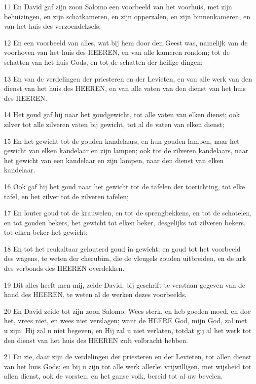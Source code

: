 \par 11 En David gaf zijn zoon Salomo een voorbeeld van het voorhuis, met zijn behuizingen, en zijn schatkameren, en zijn opperzalen, en zijn binnenkameren, en van het huis des verzoendeksels;
\par 12 En een voorbeeld van alles, wat bij hem door den Geest was, namelijk van de voorhoven van het huis des HEEREN, en van alle kameren rondom; tot de schatten van het huis Gods, en tot de schatten der heilige dingen;
\par 13 En van de verdelingen der priesteren en der Levieten, en van alle werk van den dienst van het huis des HEEREN, en van alle vaten van den dienst van het huis des HEEREN.
\par 14 Het goud gaf hij naar het goudgewicht, tot alle vaten van elken dienst; ook zilver tot alle zilveren vaten bij gewicht, tot al de vaten van elken dienst;
\par 15 En het gewicht tot de gouden kandelaars, en hun gouden lampen, naar het gewicht van elken kandelaar en zijn lampen; ook tot de zilveren kandelaars, naar het gewicht van een kandelaar en zijn lampen, naar den dienst van elken kandelaar.
\par 16 Ook gaf hij het goud naar het gewicht tot de tafelen der toerichting, tot elke tafel, en het zilver tot de zilveren tafelen;
\par 17 En louter goud tot de krauwelen, en tot de sprengbekkens, en tot de schotelen, en tot gouden bekers, het gewicht tot elken beker, desgelijks tot zilveren bekers, tot elken beker het gewicht;
\par 18 En tot het reukaltaar gelouterd goud in gewicht; en goud tot het voorbeeld des wagens, te weten der cherubim, die de vleugels zouden uitbreiden, en de ark des verbonds des HEEREN overdekken.
\par 19 Dit alles heeft men mij, zeide David, bij geschrift te verstaan gegeven van de hand des HEEREN, te weten al de werken dezes voorbeelds.
\par 20 En David zeide tot zijn zoon Salomo: Wees sterk, en heb goeden moed, en doe het, vrees niet, en wees niet verslagen; want de HEERE God, mijn God, zal met u zijn; Hij zal u niet begeven, en Hij zal u niet verlaten, totdat gij al het werk tot den dienst van het huis des HEEREN zult volbracht hebben.
\par 21 En zie, daar zijn de verdelingen der priesteren en der Levieten, tot allen dienst van het huis Gods; en bij u zijn tot alle werk allerlei vrijwilligen, met wijsheid tot allen dienst, ook de vorsten, en het ganse volk, bereid tot al uw bevelen.

